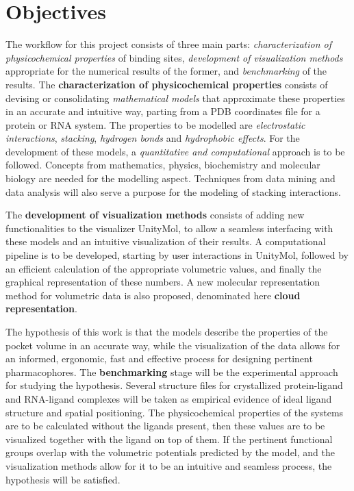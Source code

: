 \chapter{Objectives} %

The workflow for this project consists of three main parts: \textit{characterization of physicochemical properties} of binding sites, \textit{development of visualization methods} appropriate for the numerical results of the former, and \textit{benchmarking} of the results. The \textbf{characterization of physicochemical properties} consists of devising or consolidating \textit{mathematical models} that approximate these properties in an accurate and intuitive way, parting from a PDB coordinates file for a protein or RNA system. The properties to be modelled are \textit{electrostatic interactions}, \textit{stacking}, \textit{hydrogen bonds} and \textit{hydrophobic effects}. For the development of these models, a \textit{quantitative and computational} approach is to be followed. Concepts from mathematics, physics, biochemistry and molecular biology are needed for the modelling aspect. Techniques from data mining and data analysis will also serve a purpose for the modeling of stacking interactions.

The \textbf{development of visualization methods} consists of adding new functionalities to the visualizer UnityMol, to allow a seamless interfacing with these models and an intuitive visualization of their results. A computational pipeline is to be developed, starting by user interactions in UnityMol, followed by an efficient calculation of the appropriate volumetric values, and finally the graphical representation of these numbers. A new molecular representation method for volumetric data is also proposed, denominated here \textbf{cloud representation}.

The hypothesis of this work is that the models describe the properties of the pocket volume in an accurate way, while the visualization of the data allows for an informed, ergonomic, fast and effective process for designing pertinent pharmacophores. The \textbf{benchmarking} stage will be the experimental approach for studying the hypothesis. Several structure files for crystallized protein-ligand and RNA-ligand complexes will be taken as empirical evidence of ideal ligand structure and spatial positioning. The physicochemical properties of the systems are to be calculated without the ligands present, then these values are to be visualized together with the ligand on top of them. If the pertinent functional groups overlap with the volumetric potentials predicted by the model, and the visualization methods allow for it to be an intuitive and seamless process, the hypothesis will be satisfied.
